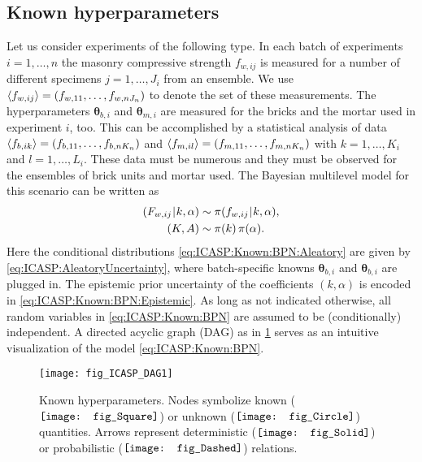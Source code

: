 \subsection{Known hyperparameters}
Let us consider experiments of the following type.
In each batch of experiments \(i=1,\ldots,n\) the masonry compressive strength \(f_{w,ij}\) is measured for a number of different specimens \(j=1,\ldots,J_i\) from an ensemble.
We use \(\langle{f_{w,ij}}\rangle = (f_{w,11},\ldots,f_{w,nJ_n})\) to denote the set of these measurements.
The hyperparameters \(\bm{\theta}_{b,i}\) and \(\bm{\theta}_{m,i}\) are measured for the bricks and the mortar used in experiment \(i\), too.
This can be accomplished by a statistical analysis of data \(\langle{f_{b,ik}}\rangle = (f_{b,11},\ldots,f_{b,nK_n})\) and \(\langle{f_{m,il}}\rangle = (f_{m,11},\ldots,f_{m,nK_n})\) with \(k=1,\ldots,K_i\) and \(l=1,\ldots,L_i\).
These data must be numerous and they must be observed for the ensembles of brick units and mortar used.
The Bayesian multilevel model for this scenario can be written as
\begin{subequations} \label{eq:ICASP:Known:BPN}
  \begin{align}
    (F_{w,ij} {\:\!}|{\:\!} k,\alpha) &\sim \pi(f_{w,ij} {\:\!}|{\:\!} k,\alpha), \label{eq:ICASP:Known:BPN:Aleatory} \\
    (K,A) &\sim \pi(k) \, \pi(\alpha). \label{eq:ICASP:Known:BPN:Epistemic}
  \end{align}
\end{subequations}
Here the conditional distributions \cref{eq:ICASP:Known:BPN:Aleatory} are given by \cref{eq:ICASP:AleatoryUncertainty}, where batch-specific knowns \(\bm{\theta}_{b,i}\) and \(\bm{\theta}_{b,i}\) are plugged in.
The epistemic prior uncertainty of the coefficients \((k,\alpha)\) is encoded in \cref{eq:ICASP:Known:BPN:Epistemic}.
As long as not indicated otherwise, all random variables in \cref{eq:ICASP:Known:BPN} are assumed to be (conditionally) independent.
A directed acyclic graph (DAG) as in \cref{fig:ICASP:DAG:1} serves as an intuitive visualization of the model \cref{eq:ICASP:Known:BPN}.
\begin{figure}[htbp]
  \centering
  \texttt{[image: fig\_ICASP\_DAG1]}
  \caption[Known hyperparameters]{Known hyperparameters.
           Nodes symbolize known (\(\vcenter{\hbox{\protect\texttt{[image: fig\_Square]}}}\))
           or unknown (\(\vcenter{\hbox{\protect\texttt{[image: fig\_Circle]}}}\)) quantities.
           Arrows represent deterministic (\(\vcenter{\hbox{\protect\texttt{[image: fig\_Solid]}}}\))
           or probabilistic (\(\vcenter{\hbox{\protect\texttt{[image: fig\_Dashed]}}}\)) relations.
          }
  \label{fig:ICASP:DAG:1}
\end{figure}
